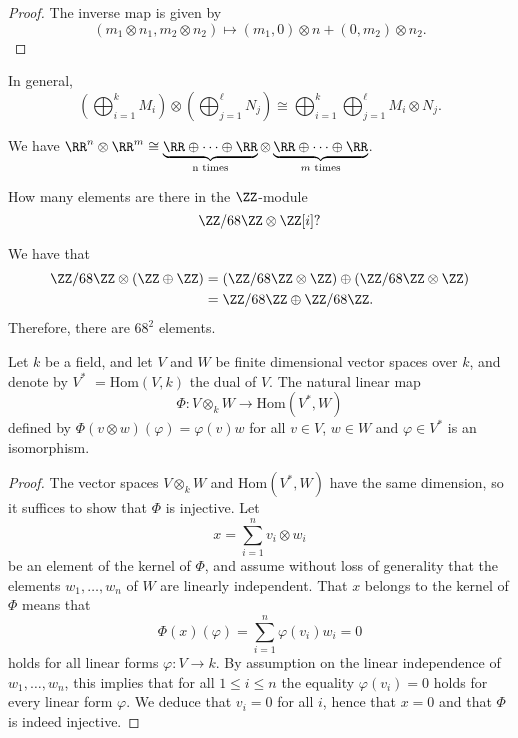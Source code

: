 \documentclass[12pt, a4paper]{article}
\begin{document}
\begin{proof}
    The inverse map is given by 
    \[(m_1\otimes n_1,m_2 \otimes n_2) \mapsto (m_1,0)\otimes n+(0,m_2)\otimes n_2.\]
\end{proof}

\begin{mdprop}
    In general,
    \[\left( \bigoplus_{i=1}^k M_i \right)\otimes \left( \bigoplus_{j=1}^{\ell} N_j \right) \cong \bigoplus_{i=1}^k \bigoplus_{j=1}^{\ell} M_i \otimes N_j.\]
\end{mdprop}

\begin{example}
    We have \(\RR^n\otimes \RR^m \cong \underbrace{\RR\oplus \cdots \oplus \RR}_{\text{n times}}\otimes \underbrace{\RR\oplus \cdots \oplus \RR}_{m \text{ times}}\).
\end{example}

\begin{mdexample}
    How many elements are there in the \(\ZZ\)-module
    \[\ZZ/68\ZZ \otimes \ZZ[i]?\]
    \begin{solution}
        We have that 
        \[\begin{aligned}
            \ZZ/68\ZZ \otimes (\ZZ \oplus \ZZ) &= (\ZZ/68\ZZ\otimes \ZZ)\oplus (\ZZ/68\ZZ\otimes \ZZ) \\
            &= \ZZ/68\ZZ \oplus \ZZ/68\ZZ.
        \end{aligned}\]
        Therefore, there are \(68^2\) elements.
    \end{solution}
\end{mdexample}

\begin{mdprop}
    Let \( k \) be a field, and let \( V \) and \( W \) be finite dimensional vector spaces over \( k \), and denote by \( V^* \) \( = \text{Hom}(V, k) \) the dual of \( V \). The natural linear map
\[ \Phi : V \otimes_k W \to \text{Hom}(V^*, W) \]
defined by \( \Phi(v \otimes w)(\varphi) = \varphi(v)w \) for all \( v \in V \), \( w \in W \) and \( \varphi \in V^* \) is an isomorphism.
\end{mdprop}

\begin{proof}
    The vector spaces \( V \otimes_k W \) and \( \text{Hom}(V^*, W) \) have the same dimension, so it suffices to show that \( \Phi \) is injective. Let
    \[ x = \sum_{i=1}^{n} v_i \otimes w_i \]
    be an element of the kernel of \( \Phi \), and assume without loss of generality that the elements \( w_1, \ldots, w_n \) of \( W \) are linearly independent. That \( x \) belongs to the kernel of \( \Phi \) means that
    \[ \Phi(x)(\varphi) = \sum_{i=1}^{n} \varphi(v_i)w_i = 0 \]
    holds for all linear forms \( \varphi : V \to k \). By assumption on the linear independence of \( w_1, \ldots, w_n \), this implies that for all \( 1 \leq i \leq n \) the equality \( \varphi(v_i) = 0 \) holds for every linear form \( \varphi \). We deduce that \( v_i = 0 \) for all \( i \), hence that \( x = 0 \) and that \( \Phi \) is indeed injective. 
\end{proof}
\end{document}
